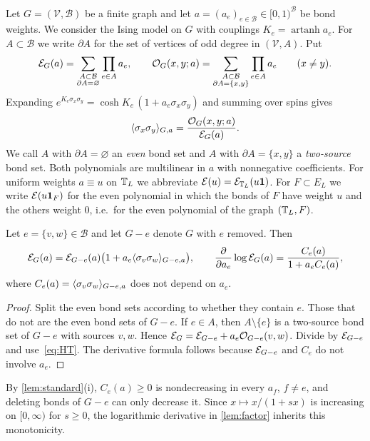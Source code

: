 Let $G=(\mathcal V,\mathcal B)$ be a finite graph and let $a=(a_e)_{e\in\mathcal B}\in[0,1)^{\mathcal B}$ be bond weights. We consider the Ising model on $G$ with couplings $K_e=\operatorname{artanh}a_e$. For $A\subset\mathcal B$ we write $\partial A$ for the set of vertices of odd degree in $(\mathcal V,A)$. Put
\begin{equation}\label{eq:evenpoly}
 \mathcal E_G(a)=\sum_{\substack{A\subset\mathcal B\\ \partial A=\varnothing}}\prod_{e\in A}a_e,\qquad
 \mathcal O_G(x,y;a)=\sum_{\substack{A\subset\mathcal B\\ \partial A=\{x,y\}}}\prod_{e\in A}a_e\qquad(x\ne y).
\end{equation}
Expanding $e^{K_e\sigma_x\sigma_y}=\cosh K_e\,(1+a_e\sigma_x\sigma_y)$ and summing over spins gives
\begin{equation}\label{eq:HT}
 \langle \sigma_x\sigma_y\rangle_{G,a}=\frac{\mathcal O_G(x,y;a)}{\mathcal E_G(a)}.
\end{equation}
We call $A$ with $\partial A=\varnothing$ an \emph{even} bond set and $A$ with $\partial A=\{x,y\}$ a \emph{two-source} bond set. Both polynomials are multilinear in $a$ with nonnegative coefficients. For uniform weights $a\equiv u$ on $\mathbb T_L$ we abbreviate $\mathcal E(u)=\mathcal E_{\mathbb T_L}(u\mathbf 1)$. For $F\subset E_L$ we write $\mathcal E(u\mathbf 1_F)$ for the even polynomial in which the bonds of $F$ have weight $u$ and the others weight $0$, i.e.\ for the even polynomial of the graph $(\mathbb T_L,F)$.

\begin{lemma}\label{lem:factor}
Let $e=\{v,w\}\in\mathcal B$ and let $G-e$ denote $G$ with $e$ removed. Then
\[
 \mathcal E_G(a)=\mathcal E_{G-e}(a)\bigl(1+a_e\langle \sigma_v\sigma_w\rangle_{G-e,a}\bigr),
 \qquad
 \frac{\partial}{\partial a_e}\log\mathcal E_G(a)=\frac{C_e(a)}{1+a_eC_e(a)},
\]
where $C_e(a)=\langle \sigma_v\sigma_w\rangle_{G-e,a}$ does not depend on $a_e$.
\end{lemma}

\begin{proof}
Split the even bond sets according to whether they contain $e$. Those that do not are the even bond sets of $G-e$. If $e\in A$, then $A\setminus\{e\}$ is a two-source bond set of $G-e$ with sources $v,w$. Hence $\mathcal E_G=\mathcal E_{G-e}+a_e\mathcal O_{G-e}(v,w)$. Divide by $\mathcal E_{G-e}$ and use~\eqref{eq:HT}. The derivative formula follows because $\mathcal E_{G-e}$ and $C_e$ do not involve $a_e$.
\end{proof}

By \cref{lem:standard}(i), $C_e(a)\ge0$ is nondecreasing in every $a_f$, $f\ne e$, and deleting bonds of $G-e$ can only decrease it. Since $x\mapsto x/(1+sx)$ is increasing on $[0,\infty)$ for $s\ge0$, the logarithmic derivative in \cref{lem:factor} inherits this monotonicity.

